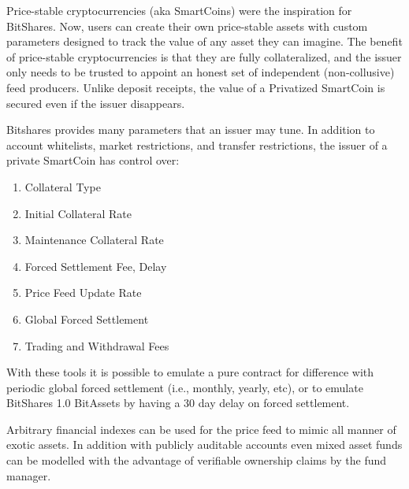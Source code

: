 Price-stable cryptocurrencies (aka SmartCoins) were the inspiration for
BitShares. Now, users can create their own price-stable assets with custom
parameters designed to track the value of any asset they can imagine. The
benefit of price-stable cryptocurrencies is that they are fully collateralized,
and the issuer only needs to be trusted to appoint an honest set of independent
(non-collusive) feed producers. Unlike deposit receipts, the value of a
Privatized SmartCoin is secured even if the issuer disappears.

Bitshares provides many parameters that an issuer may tune. In addition to
account whitelists, market restrictions, and transfer restrictions, the issuer
of a private SmartCoin has control over:

\begin{enumerate}
 \item Collateral Type
 \item Initial Collateral Rate
 \item Maintenance Collateral Rate
 \item Forced Settlement Fee, Delay %
 \item Price Feed Update Rate
 \item Global Forced Settlement
 \item Trading and Withdrawal Fees
\end{enumerate}

With these tools it is possible to emulate a pure contract for difference with
periodic global forced settlement (i.e., monthly, yearly, etc), or to emulate
BitShares 1.0 BitAssets by having a 30 day delay on forced settlement.

Arbitrary financial indexes can be used for the price feed to mimic all manner
of exotic assets. In addition with publicly auditable accounts even mixed asset
funds can be modelled with the advantage of verifiable ownership claims by the
fund manager.
